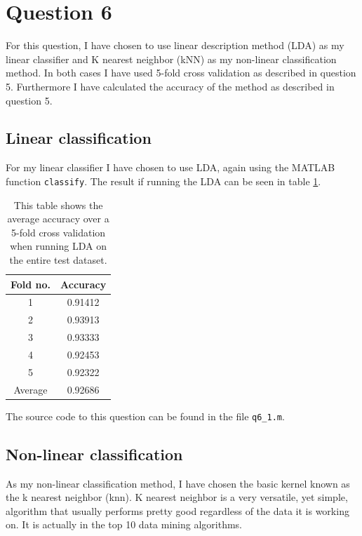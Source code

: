 \documentclass[10pt]{article}
\begin{document}

\section*{Question 6} %
\label{sec:question_6}

For this question, I have chosen to use linear description method (LDA) as my linear classifier and K nearest neighbor (kNN) as my non-linear classification method. In both cases I have used 5-fold cross validation as described in question 5. Furthermore I have calculated the accuracy of the method as described in question 5.  

\subsection*{Linear classification} %
\label{sub:linear_classification2}

For my linear classifier I have chosen to use LDA, again using the MATLAB function \texttt{classify}. The result if running the LDA can be seen in table \ref{table3}.

\begin{table}
  \begin{center}  
    \begin{tabular}{ | c | c |}
      \hline
      Fold no. & Accuracy\\
      \hline
      1    &     0.91412\\
      2    &     0.93913\\
      3    &     0.93333\\
      4    &     0.92453\\
      5    &     0.92322\\
      \hline
      Average &  0.92686 \\
      \hline
    \end{tabular}
    \caption{This table shows the average accuracy over a 5-fold cross validation when running LDA on the entire test dataset.}
    \label{table3}
  \end{center}    
\end{table}   

The source code to this question can be found in the file \texttt{q6\_1.m}.



\subsection*{Non-linear classification} %
\label{sub:non_linear_classification2}
As my non-linear classification method, I have chosen the basic kernel known as the k nearest neighbor (knn). K nearest neighbor is a very versatile, yet simple, algorithm that usually performs pretty good regardless of the data it is working on. It is actually in the top 10 data mining algorithms\cite{Wu07doi10.1007/s10115-007-0114-2}.
\end{document}
